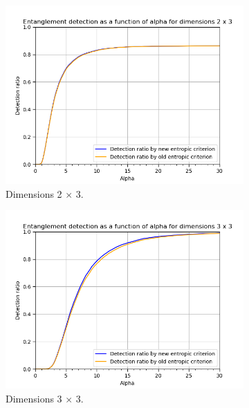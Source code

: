 \begin{figure}[ht] 
  \begin{subfigure}[b]{0.5\linewidth}
    \centering
    \includegraphics[width=0.95\linewidth]{images/renyi_comparison_2_3_30_0.2.png} 
    \caption{Dimensions 2 $\times$ 3.} 
    \label{fig:renyi_2x3} 
    \vspace{2ex}
  \end{subfigure}%
  \begin{subfigure}[b]{0.5\linewidth}
    \centering
    \includegraphics[width=0.95\linewidth]{images/renyi_comparison_3_3_30_0.2.png} 
    \caption{Dimensions 3 $\times$ 3.} 
    \label{fig:renyi_3x3} 
    \vspace{2ex}
  \end{subfigure} 
  \begin{subfigure}[b]{0.5\linewidth}

\end{subfigure}
\end{figure}
